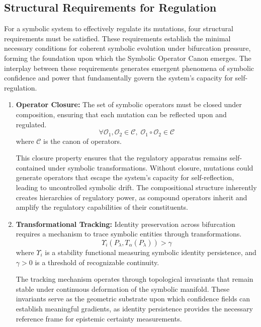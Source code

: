 \subsection{Structural Requirements for Regulation}
\label{subsection:bk6_structural_requirements_for_regulation}

For a symbolic system to effectively regulate its mutations, four structural requirements must be satisfied. These requirements establish the minimal necessary conditions for coherent symbolic evolution under bifurcation pressure, forming the foundation upon which the Symbolic Operator Canon emerges. The interplay between these requirements generates emergent phenomena of symbolic confidence and power that fundamentally govern the system's capacity for self-regulation.

\begin{enumerate}
\item \textbf{Operator Closure:} The set of symbolic operators must be closed under composition, ensuring that each mutation can be reflected upon and regulated.
\begin{equation}
\forall \mathcal{O}_1, \mathcal{O}_2 \in \mathcal{C}, \; \mathcal{O}_1 \circ \mathcal{O}_2 \in \mathcal{C}
\end{equation}
where $\mathcal{C}$ is the canon of operators.

This closure property ensures that the regulatory apparatus remains self-contained under symbolic transformations. Without closure, mutations could generate operators that escape the system's capacity for self-reflection, leading to uncontrolled symbolic drift. The compositional structure inherently creates hierarchies of regulatory power, as compound operators inherit and amplify the regulatory capabilities of their constituents.

\item \textbf{Transformational Tracking:} Identity preservation across bifurcation requires a mechanism to trace symbolic entities through transformations.
\begin{equation}
\Upsilon_i(P_{\lambda}, T_{\alpha}(P_{\lambda})) > \gamma
\end{equation}
where $\Upsilon_i$ is a stability functional measuring symbolic identity persistence, and $\gamma > 0$ is a threshold of recognizable continuity.

The tracking mechanism operates through topological invariants that remain stable under continuous deformation of the symbolic manifold. These invariants serve as the geometric substrate upon which confidence fields can establish meaningful gradients, as identity persistence provides the necessary reference frame for epistemic certainty measurements.


\end{enumerate}
